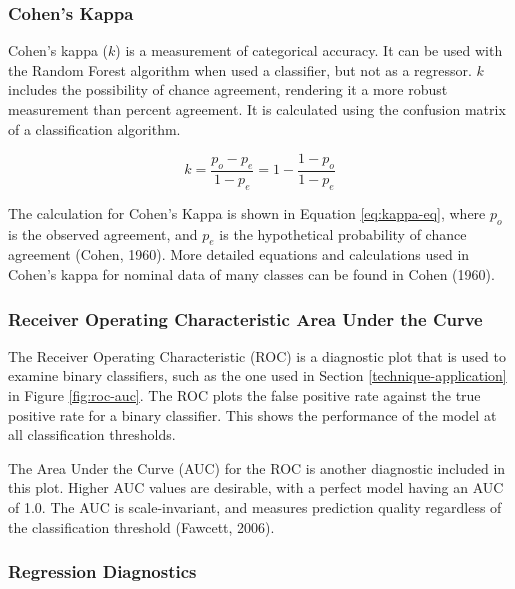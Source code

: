 \documentclass[
]{article}
\begin{document}
\hypertarget{cohens-kappa}{%
\subsubsection{Cohen's Kappa}\label{cohens-kappa}}

Cohen's kappa (\(k\)) is a measurement of categorical accuracy. It can be used with the Random Forest algorithm when used a classifier, but not as a regressor. \(k\) includes the possibility of chance agreement, rendering it a more robust measurement than percent agreement. It is calculated using the confusion matrix of a classification algorithm.

\begin{equation}
  k = \frac{p_o - p_e}{1 - p_e} = 1 - \frac{1 - p_o}{1 - p_e}
  \label{eq:kappa-eq}
\end{equation}

The calculation for Cohen's Kappa is shown in Equation \eqref{eq:kappa-eq}, where \(p_o\) is the observed agreement, and \(p_e\) is the hypothetical probability of chance agreement (Cohen, 1960). More detailed equations and calculations used in Cohen's kappa for nominal data of many classes can be found in Cohen (1960).

\hypertarget{receiver-operating-characteristic-area-under-the-curve}{%
\subsubsection{Receiver Operating Characteristic Area Under the Curve}\label{receiver-operating-characteristic-area-under-the-curve}}

The Receiver Operating Characteristic (ROC) is a diagnostic plot that is used to examine binary classifiers, such as the one used in Section \ref{technique-application} in Figure \ref{fig:roc-auc}. The ROC plots the false positive rate against the true positive rate for a binary classifier. This shows the performance of the model at all classification thresholds.

The Area Under the Curve (AUC) for the ROC is another diagnostic included in this plot. Higher AUC values are desirable, with a perfect model having an AUC of 1.0. The AUC is scale-invariant, and measures prediction quality regardless of the classification threshold (Fawcett, 2006).

\hypertarget{regression-diagnostics}{%
\subsubsection{Regression Diagnostics}\label{regression-diagnostics}}
\end{document}
